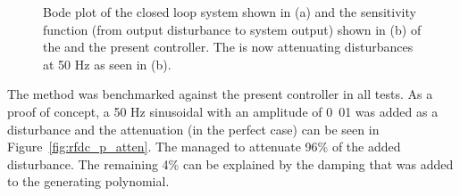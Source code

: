 \begin{figure}[h!]
  \centering %
  \qquad
  \caption{\label{fig:rfdc_s_gc} Bode plot of the closed loop system shown in (a) and the sensitivity function (from output disturbance to system output) shown in (b) of the \abbrIMP and the present controller. The \abbrIMP is now attenuating disturbances at 50 Hz as seen in (b).}
\end{figure}

\FloatBarrier
The \abbrIMP method was benchmarked against the present controller in all tests. As a proof of concept, a 50 Hz sinusoidal with an amplitude of \unit{0.01}{\micro\radian} was added as a disturbance and the attenuation (in the perfect case) can be seen in Figure~\ref{fig:rfdc_p_atten}. The \abbrIMP managed to attenuate 96\% of the added disturbance. The remaining 4\% can be explained by the damping that was added to the generating polynomial.

